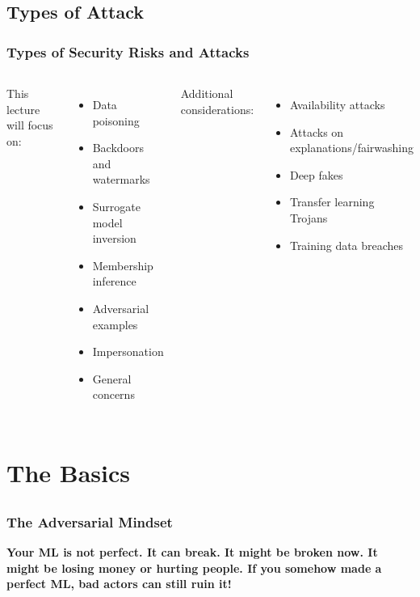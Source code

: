\documentclass[11pt,
               aspectratio=169,
               hyperref={colorlinks}
               ]{beamer}
\begin{document}
		\subsection{Types of Attack} %
			
		\begin{frame}
		
			\frametitle{Types of Security Risks and Attacks}
			
		
				\begin{columns}[t]

					This lecture will focus on:
					\begin{itemize}
						\item Data poisoning
						\item Backdoors and watermarks
						\item Surrogate model inversion
						\item Membership inference
						\item Adversarial examples
						\item Impersonation 
						\item General concerns						
					\end{itemize}	

					Additional considerations:
					\begin{itemize}
						\item Availability attacks				
						\item Attacks on explanations/fairwashing
						\item Deep fakes
						\item Transfer learning Trojans	
						\item Training data breaches				
					\end{itemize}

				\end{columns}


		
					
		\end{frame}	
	
	\section{The Basics}
	
	\subsection*{}
	\begin{frame}
		
		\frametitle{The Adversarial Mindset}
			
		\LARGE{\textbf{Your ML is not perfect. It can break. It might be broken now. It might be losing money or hurting people. If you somehow made a perfect ML, bad actors can still ruin it!}}
			
	\end{frame}	
	
\end{document}
